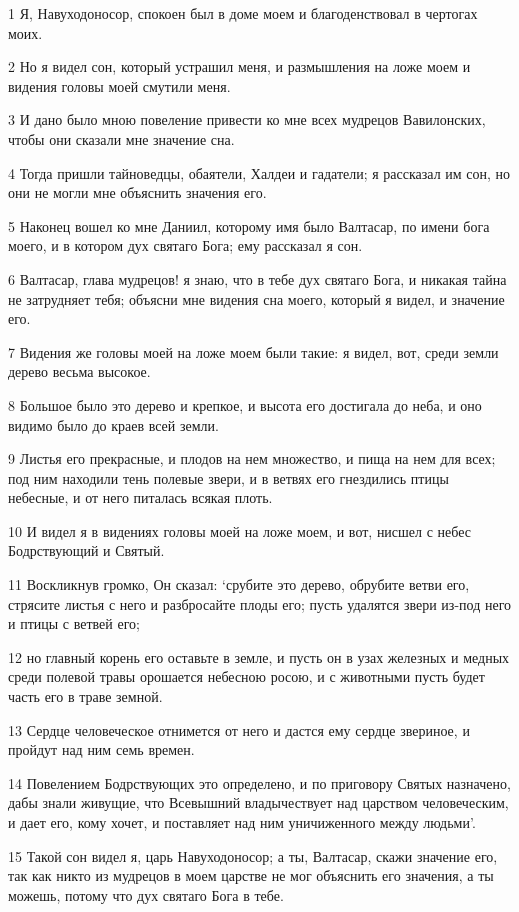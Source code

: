 \par 1 Я, Навуходоносор, спокоен был в доме моем и благоденствовал в чертогах моих.
\par 2 Но я видел сон, который устрашил меня, и размышления на ложе моем и видения головы моей смутили меня.
\par 3 И дано было мною повеление привести ко мне всех мудрецов Вавилонских, чтобы они сказали мне значение сна.
\par 4 Тогда пришли тайноведцы, обаятели, Халдеи и гадатели; я рассказал им сон, но они не могли мне объяснить значения его.
\par 5 Наконец вошел ко мне Даниил, которому имя было Валтасар, по имени бога моего, и в котором дух святаго Бога; ему рассказал я сон.
\par 6 Валтасар, глава мудрецов! я знаю, что в тебе дух святаго Бога, и никакая тайна не затрудняет тебя; объясни мне видения сна моего, который я видел, и значение его.
\par 7 Видения же головы моей на ложе моем были такие: я видел, вот, среди земли дерево весьма высокое.
\par 8 Большое было это дерево и крепкое, и высота его достигала до неба, и оно видимо было до краев всей земли.
\par 9 Листья его прекрасные, и плодов на нем множество, и пища на нем для всех; под ним находили тень полевые звери, и в ветвях его гнездились птицы небесные, и от него питалась всякая плоть.
\par 10 И видел я в видениях головы моей на ложе моем, и вот, нисшел с небес Бодрствующий и Святый.
\par 11 Воскликнув громко, Он сказал: `срубите это дерево, обрубите ветви его, стрясите листья с него и разбросайте плоды его; пусть удалятся звери из-под него и птицы с ветвей его;
\par 12 но главный корень его оставьте в земле, и пусть он в узах железных и медных среди полевой травы орошается небесною росою, и с животными пусть будет часть его в траве земной.
\par 13 Сердце человеческое отнимется от него и дастся ему сердце звериное, и пройдут над ним семь времен.
\par 14 Повелением Бодрствующих это определено, и по приговору Святых назначено, дабы знали живущие, что Всевышний владычествует над царством человеческим, и дает его, кому хочет, и поставляет над ним уничиженного между людьми'.
\par 15 Такой сон видел я, царь Навуходоносор; а ты, Валтасар, скажи значение его, так как никто из мудрецов в моем царстве не мог объяснить его значения, а ты можешь, потому что дух святаго Бога в тебе.
